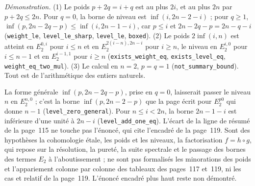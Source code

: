 {\small \emph{Démonstration.} (1) Le poids $p + 2q = i + q$ est au plus $2i$, et au plus $2n$ par $p + 2q \leq 2n$. Pour $q = 0$, la borne de niveau est $\inf(i, 2n - 2 - i)$ ; pour $q \geq 1$, $\inf(p, 2n - 2q - p) \leq \inf(i, 2n - 1 - i)$, car $p \leq i$ et $2n - 2q - p = 2n - q - i$ (\texttt{weight\_le}, \texttt{level\_le\_sharp}, \texttt{level\_le}, \texttt{boxed}). (2) Le poids $2\inf(i, n)$ est atteint en $E_2^{0,i}$ pour $i \leq n$ et en $E_2^{2(i-n), 2n-i}$ pour $i \geq n$, le niveau en $E_2^{i,0}$ pour $i \leq n - 1$ et en $E_2^{i-1,1}$ pour $i \geq n$ (\texttt{exists\_weight\_eq}, \texttt{exists\_level\_eq}, \texttt{weight\_eq\_two\_mul}). (3) Le calcul en $n = 2$, $p = q = 1$ (\texttt{not\_summary\_bound}). Tout est de l'arithmétique des entiers naturels.

La forme générale $\inf(p, 2n - 2q - p)$, prise en $q = 0$, laisserait passer le niveau $n$ en $E_2^{n,0}$ ; c'est la borne $\inf(p, 2n - 2 - p)$ que la page écrit pour $E_2^{p0}$ qui donne $n - 1$ (\texttt{level\_zero\_general}). Pour $n \leq i < 2n$, la borne $2n - 1 - i$ est inférieure d'une unité à $2n - i$ (\texttt{level\_add\_one\_eq}). L'écart de la ligne de résumé de la page~115 ne touche pas l'énoncé, qui cite l'encadré de la page~119. Sont des hypothèses la cohomologie étale, les poids et les niveaux, la factorisation $f = h \circ g$, qui repose sur la résolution, la pureté, la suite spectrale et le passage des bornes des termes $E_2$ à l'aboutissement ; ne sont pas formalisés les minorations des poids et l'appariement colonne par colonne des tableaux des pages~117 et~119, ni les cas  et relatif de la page~119. L'énoncé encadré plus haut reste non démontré.\par}
